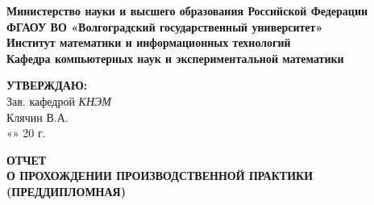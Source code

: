 \documentclass[12pt,a4paper]{scrartcl}
\begin{document}
	\begin{center}
		\textbf{Министерство науки и высшего образования Российской Федерации} \\
		\textbf{ФГАОУ ВО «Волгоградский государственный университет»} \\
		\textbf{Институт математики и информационных технологий} \\
		\textbf{Кафедра компьютерных наук и экспериментальной математики} \\
		
		\vspace{0.6cm}
		
		\hfill\begin{minipage}{0.4\textwidth}
		\begin{flushright}
			\textbf{\textsc{УТВЕРЖДАЮ:}} \\
			Зав. кафедрой \textit{КНЭМ} \\
			Клячин В.А.\\
			«\underline{\hspace{0.7cm}}» \underline{\hspace{2.5cm}} 20\underline{\hspace{0.7cm}} г.
		\end{flushright}
		\end{minipage}
		
		\vspace{0.6cm}
		
		\textbf{
			ОТЧЕТ\\О ПРОХОЖДЕНИИ ПРОИЗВОДСТВЕННОЙ ПРАКТИКИ\\(ПРЕДДИПЛОМНАЯ)
			\vspace{0.2cm}
		}
		
		\vspace{0.3cm}
		\renewcommand{\arraystretch}{1.5} %
		

\end{center}
\end{document}
